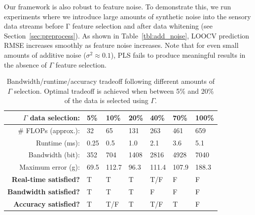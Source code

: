 Our framework is also robust to feature noise. To demonstrate this, we run experiments where we introduce large amounts of synthetic noise into the sensory data streams before Γ feature selection and after data whitening (see Section~\ref{sec:preprocess}). As shown in Table~\ref{tbl:add_noise}, LOOCV prediction RMSE increases smoothly as feature noise increases. Note that for even small amounts of additive noise ($\sigma^2 \approx 0.1$), PLS fails to produce meaningful results in the absence of $\Gamma$ feature selection.

\begin{center}
\begin{table}[h]
\begin{tabular}{|l|l|l|l|l|l|l|}
\hline
\multicolumn{1}{|r|}{$\Gamma$ data selection:} & 5\%           & 10\%          & 20\%          & 40\%          & 70\%          & 100\%  \\ \hline
\multicolumn{1}{|r|}{\# FLOPs (approx.):}      & 32             & 65           & 131          & 263          & 461          & 659 \\ \hline
\multicolumn{1}{|r|}{Runtime (ms):}    & 0.25          & 0.5          & 1.0         & 2.1           & 3.6         & 5.1 \\ \hline
\multicolumn{1}{|r|}{Bandwidth (bit):} & 352             & 704           & 1408          & 2816          & 4928          & 7040          \\ \hline
\multicolumn{1}{|r|}{Maximum error (g):} & 69.5 & 112.7 & 96.3 & 111.4 &  107.9 & 188.3 \\ \hline
\multicolumn{1}{|r|}{\textbf{Real-time satisfied?}}        & T           & T         & T         & T/F   & F        & F        \\ \hline
\multicolumn{1}{|r|}{\textbf{Bandwidth satisfied?}}       & T           & T         & T         & F   & F        & F        \\ \hline
\multicolumn{1}{|r|}{\textbf{Accuracy satisfied?}}        & T           & T/F       & T         & T/F     & T        & F        \\ \hline
\end{tabular}
\caption{Bandwidth/runtime/accuracy tradeoff following different amounts of $\Gamma$ selection. Optimal tradeoff is achieved when between 5\% and 20\% of the data is selected using $\Gamma$.} 
\label{tbl:tradeoff}
\end{table}
\end{center}

